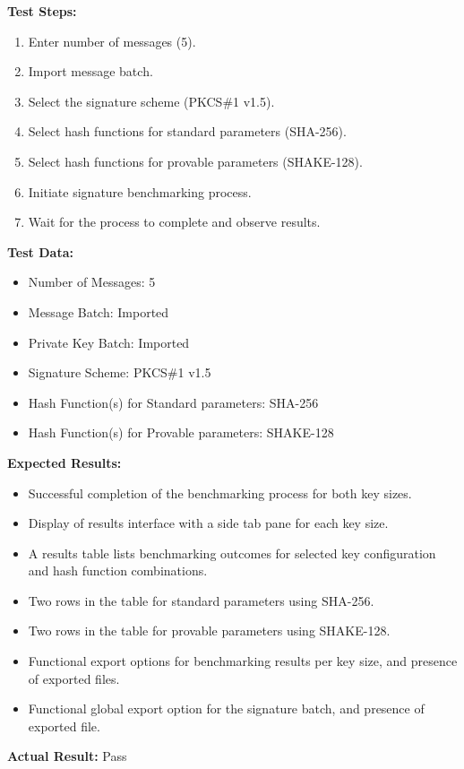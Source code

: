 \documentclass[]{final_report}
\theoremstyle{definition}
\begin{document}
\textbf{Test Steps:}
\begin{enumerate}
    \item Enter number of messages (5).
    \item Import message batch.
    \item Select the signature scheme (PKCS\#1 v1.5).
    \item Select hash functions for standard parameters (SHA-256).
    \item Select hash functions for provable parameters (SHAKE-128).
    \item Initiate signature benchmarking process.
    \item Wait for the process to complete and observe results.
\end{enumerate}

\textbf{Test Data:}
\begin{itemize}
    \item Number of Messages: 5
    \item Message Batch: Imported
    \item Private Key Batch: Imported
    \item Signature Scheme: PKCS\#1 v1.5
    \item Hash Function(s) for Standard parameters: SHA-256
    \item Hash Function(s) for Provable parameters: SHAKE-128
\end{itemize}

\textbf{Expected Results:}
\begin{itemize}
    \item Successful completion of the benchmarking process for both key sizes.
    \item Display of results interface with a side tab pane for each key size.
    \item A results table lists benchmarking outcomes for selected key configuration and hash function combinations.
    \item Two rows in the table for standard parameters using SHA-256.
    \item Two rows in the table for provable parameters using SHAKE-128.
    \item Functional export options for benchmarking results per key size, and presence of exported files.
    \item Functional global export option for the signature batch, and presence of exported file.
\end{itemize}

\textbf{Actual Result:} Pass
\end{document}
